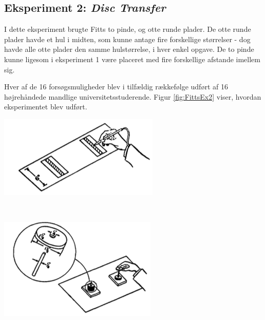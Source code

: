 \subsection*{Eksperiment 2: \textit{Disc Transfer}}
I dette eksperiment brugte Fitts to pinde, og otte runde plader. De otte runde plader havde et hul i midten, som kunne antage fire forskellige størrelser - dog havde alle otte plader den samme hulstørrelse, i hver enkel opgave. De to pinde kunne ligesom i eksperiment 1 være placeret med fire forskellige afstande imellem sig. 

Hver af de 16 forsøgsmuligheder blev i tilfældig rækkefølge udført af 16 højrehåndede mandlige universitetsstuderende. Figur \ref{fig:FittsEx2} viser, hvordan eksperimentet blev udført.

\begin{minipage}[c]{\linewidth}
	\begin{minipage}[b]{.45\linewidth}
		\includegraphics[width=\textwidth]{images/illustrations/fitt_ex1}
		\label{fig:FittsEx1}
	\end{minipage}
	\begin{minipage}[b]{.1\linewidth}
		~
	\end{minipage}
	\begin{minipage}[b]{.45\linewidth}
		\includegraphics[width=\textwidth]{images/illustrations/fitt_ex2}
		\label{fig:FittsEx2}
	\end{minipage}
\end{minipage}

